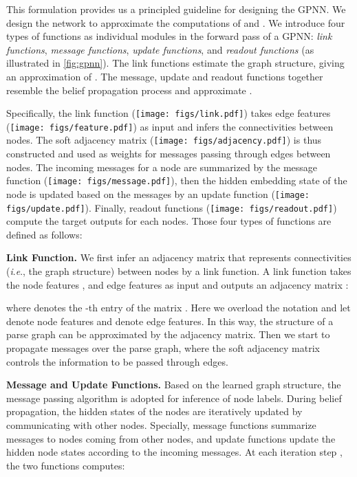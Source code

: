 \documentclass[runningheads]{llncs}
\newcommand{\ie}{\textit{i}.\textit{e}.}
\begin{document}
This formulation provides us a principled guideline for designing the GPNN. We design the network to approximate the computations of  and . We introduce four types of functions as individual modules in the forward pass of a GPNN: \textit{link functions}, \textit{message functions}, \textit{update functions}, and \textit{readout functions} (as illustrated in \autoref{fig:gpnn}).
The link functions  estimate the graph structure, giving an approximation of . The message, update and readout functions together resemble the belief propagation process and approximate .

Specifically, the link function  (\texttt{[image: figs/link.pdf]}) takes edge features (\texttt{[image: figs/feature.pdf]}) as input and infers the connectivities between nodes. The soft adjacency matrix (\texttt{[image: figs/adjacency.pdf]}) is thus constructed and used as weights for messages passing through edges between nodes. The incoming messages for a node are summarized by the message function (\texttt{[image: figs/message.pdf]}), then the hidden embedding state of the node is updated based on the messages by an update function (\texttt{[image: figs/update.pdf]}). Finally, readout functions (\texttt{[image: figs/readout.pdf]}) compute the target outputs for each nodes. Those four types of functions are defined as follows:



\noindent\textbf{Link Function.} We first infer an adjacency matrix that represents connectivities (\ie, the graph structure) between nodes by a link function. A link function  takes the node features , and edge features  as input and outputs an adjacency matrix :


where  denotes the -th entry of the matrix . Here we overload the notation and let  denote node features and  denote edge features.
In this way, the structure of a parse graph  can be approximated by the adjacency matrix. Then we start to propagate messages over the parse graph, where the soft adjacency matrix controls the information to be passed through edges.

\noindent\textbf{Message and Update Functions.} Based on the learned graph structure, the message passing algorithm is adopted for inference of node labels. During belief propagation, the hidden states of the nodes are iteratively updated by communicating with other nodes. Specially, message functions  summarize messages to nodes coming from other nodes, and update functions  update the hidden node states according to the incoming messages. At each iteration step , the two functions computes:
\end{document}
